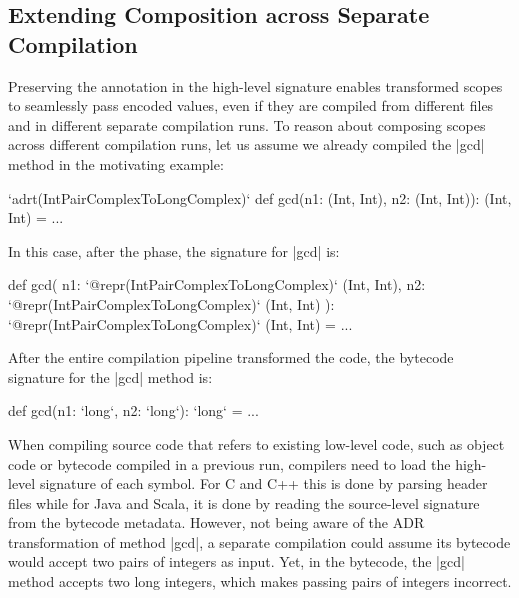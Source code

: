 \subsection{Extending Composition across Separate Compilation}
\label{sec:ildl:separate-compilation}

Preserving the annotation in the high-level signature enables transformed scopes to seamlessly pass encoded values, even if they are compiled from different files and in different separate compilation runs. To reason about composing scopes across different compilation runs, let us assume we already compiled the |gcd| method in the motivating example:

\begin{lstlisting-nobreak}
`adrt(IntPairComplexToLongComplex)` {
  def gcd(n1: (Int, Int), n2: (Int, Int)): (Int, Int) = ...
}
\end{lstlisting-nobreak}

In this case, after the \inject{} phase, the signature for |gcd| is:

\begin{lstlisting-nobreak}
def gcd(
    n1: `@repr(IntPairComplexToLongComplex)` (Int, Int),
    n2: `@repr(IntPairComplexToLongComplex)` (Int, Int)
  ): `@repr(IntPairComplexToLongComplex)` (Int, Int) = ...
\end{lstlisting-nobreak}

After the entire compilation pipeline transformed the code, the bytecode signature for the |gcd| method is:

\begin{lstlisting-nobreak}
def gcd(n1: `long`, n2: `long`): `long` = ...
\end{lstlisting-nobreak}

When compiling source code that refers to existing low-level code, such as object code or bytecode compiled in a previous run, compilers need to load the high-level signature of each symbol. For C and C++ this is done by parsing header files while for Java and Scala, it is done by reading the source-level signature from the bytecode metadata. However, not being aware of the ADR transformation of method |gcd|, a separate compilation could assume its bytecode would accept two pairs of integers as input. Yet, in the bytecode, the |gcd| method accepts two long integers, which makes passing pairs of integers incorrect.

